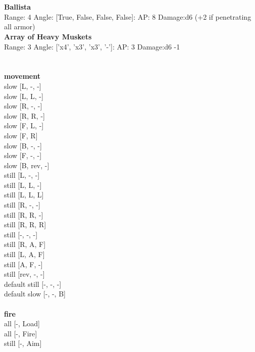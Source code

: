 \ \\

\ \\
{\bf Ballista } \\



Range: 4  Angle: [True, False, False, False]: AP: 8 Damage:d6 (+2 if penetrating all armor) \\




{\bf Array of Heavy Muskets } \\



Range: 3  Angle: ['x4', 'x3', 'x3', '-']: AP: 3 Damage:d6 -1 \\




 
\ \\



\ \\ {\bf movement } \\
slow [L, -, -] \\
slow [L, L, -] \\
slow [R, -, -] \\
slow [R, R, -] \\
slow [F, L, -] \\
slow [F, R] \\
slow [B, -, -] \\
slow [F, -, -] \\
slow [B, rev, -] \\
still [L, -, -] \\
still [L, L, -] \\
still [L, L, L] \\
still [R, -, -] \\
still [R, R, -] \\
still [R, R, R] \\
still [-, -, -] \\
still [R, A, F] \\
still [L, A, F] \\
still [A, F, -] \\
still [rev, -, -] \\
default still [-, -, -] \\
default slow [-, -, B] \\
\ \\ {\bf fire } \\
all [-, Load] \\
all [-, Fire] \\
still [-, Aim] \\


